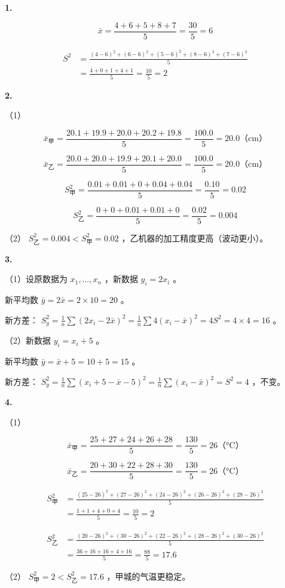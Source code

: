 \begin{answer}


\textbf{1.}

\[
\bar{x} = \frac{4 + 6 + 5 + 8 + 7}{5} = \frac{30}{5} = 6
\]


\[
\begin{aligned}
S^2 &= \frac{(4-6)^2 + (6-6)^2 + (5-6)^2 + (8-6)^2 + (7-6)^2}{5} \\
&= \frac{4 + 0 + 1 + 4 + 1}{5} = \frac{10}{5} = 2
\end{aligned}
\]


\textbf{2.}

（1）

\[
\bar{x}_{\text{甲}} = \frac{20.1 + 19.9 + 20.0 + 20.2 + 19.8}{5} = \frac{100.0}{5} = 20.0 \text{（cm）}
\]


\[
\bar{x}_{\text{乙}} = \frac{20.0 + 20.0 + 19.9 + 20.1 + 20.0}{5} = \frac{100.0}{5} = 20.0 \text{（cm）}
\]


\[
S^2_{\text{甲}} = \frac{0.01 + 0.01 + 0 + 0.04 + 0.04}{5} = \frac{0.10}{5} = 0.02
\]


\[
S^2_{\text{乙}} = \frac{0 + 0 + 0.01 + 0.01 + 0}{5} = \frac{0.02}{5} = 0.004
\]


（2） $S^2_{\text{乙}} = 0.004 < S^2_{\text{甲}} = 0.02$ ，乙机器的加工精度更高（波动更小）。

\textbf{3.}

（1）设原数据为 $x_1, \ldots, x_n$ ，新数据 $y_i = 2x_i$ 。

新平均数 $\bar{y} = 2\bar{x} = 2 \times 10 = 20$ 。

新方差： $S^2_y = \frac{1}{n}\sum(2x_i - 2\bar{x})^2 = \frac{1}{n}\sum 4(x_i - \bar{x})^2 = 4S^2 = 4 \times 4 = 16$ 。

（2）新数据 $y_i = x_i + 5$ 。

新平均数 $\bar{y} = \bar{x} + 5 = 10 + 5 = 15$ 。

新方差： $S^2_y = \frac{1}{n}\sum(x_i + 5 - \bar{x} - 5)^2 = \frac{1}{n}\sum(x_i - \bar{x})^2 = S^2 = 4$ ，不变。

\textbf{4.}

（1）

\[
\bar{x}_{\text{甲}} = \frac{25 + 27 + 24 + 26 + 28}{5} = \frac{130}{5} = 26 \text{（°C）}
\]


\[
\bar{x}_{\text{乙}} = \frac{20 + 30 + 22 + 28 + 30}{5} = \frac{130}{5} = 26 \text{（°C）}
\]


\[
\begin{aligned}
S^2_{\text{甲}} &= \frac{(25-26)^2 + (27-26)^2 + (24-26)^2 + (26-26)^2 + (28-26)^2}{5} \\
&= \frac{1 + 1 + 4 + 0 + 4}{5} = \frac{10}{5} = 2
\end{aligned}
\]


\[
\begin{aligned}
S^2_{\text{乙}} &= \frac{(20-26)^2 + (30-26)^2 + (22-26)^2 + (28-26)^2 + (30-26)^2}{5} \\
&= \frac{36 + 16 + 16 + 4 + 16}{5} = \frac{88}{5} = 17.6
\end{aligned}
\]


（2） $S^2_{\text{甲}} = 2 < S^2_{\text{乙}} = 17.6$ ，甲城的气温更稳定。

\end{answer}
